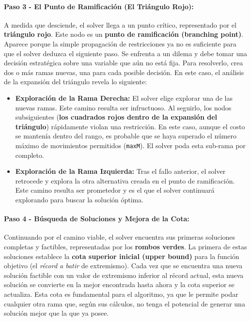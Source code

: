 \documentclass[11pt,letter]{article}
\begin{document}
\paragraph{Paso 3 - El Punto de Ramificación (El Triángulo Rojo):}
A medida que desciende, el solver llega a un punto crítico, representado por el \textbf{triángulo rojo}. Este nodo es un \textbf{punto de ramificación (branching point)}. Aparece porque la simple propagación de restricciones ya no es suficiente para que el solver deduzca el siguiente paso. Se enfrenta a un dilema y debe tomar una decisión estratégica sobre una variable que aún no está fija. Para resolverlo, crea dos o más ramas nuevas, una para cada posible decisión. En este caso, el análisis de la expansión del triángulo revela lo siguiente:
\begin{itemize}
    \item \textbf{Exploración de la Rama Derecha:} El solver elige explorar una de las nuevas ramas. Este camino resulta ser infructuoso. Al seguirlo, los nodos subsiguientes (\textbf{los cuadrados rojos dentro de la expansión del triángulo}) rápidamente violan una restricción. En este caso, aunque el costo se mantenía dentro del rango, es probable que se haya superado el número máximo de movimientos permitidos (\texttt{maxM}). El solver poda esta sub-rama por completo.
    \item \textbf{Exploración de la Rama Izquierda:} Tras el fallo anterior, el solver retrocede y explora la otra alternativa creada en el punto de ramificación. Este camino resulta ser prometedor y es el que el solver continuará explorando para buscar la solución óptima.
\end{itemize}

\paragraph{Paso 4 - Búsqueda de Soluciones y Mejora de la Cota:}
Continuando por el camino viable, el solver encuentra sus primeras soluciones completas y factibles, representadas por los \textbf{rombos verdes}. La primera de estas soluciones establece la \textbf{cota superior inicial (upper bound)} para la función objetivo (el \textit{récord a batir} de extremismo). Cada vez que se encuentra una nueva solución factible con un valor de extremismo inferior al récord actual, esta nueva solución se convierte en la mejor encontrada hasta ahora y la cota superior se actualiza. Esta cota es fundamental para el algoritmo, ya que le permite podar cualquier otra rama que, según sus cálculos, no tenga el potencial de generar una solución mejor que la que ya posee.
\end{document}
